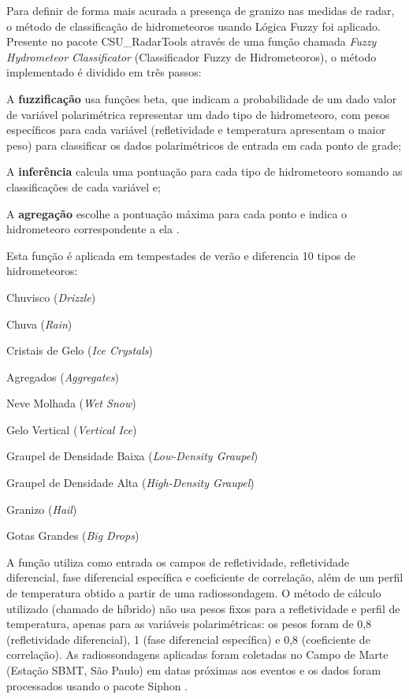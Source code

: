 Para definir de forma mais acurada a presença de granizo nas medidas de radar, o método de classificação de hidrometeoros usando Lógica Fuzzy foi aplicado. Presente no pacote CSU\_RadarTools \cite{Lang2017a} através de uma função chamada \textit{Fuzzy Hydrometeor Classificator} (Classificador Fuzzy de Hidrometeoros), o método implementado é dividido em três passos:

\begin{alineas}
	\item A \textbf{fuzzificação} usa funções beta, que indicam a probabilidade de um dado valor de variável polarimétrica representar um dado tipo de hidrometeoro, com pesos específicos para cada variável (refletividade e temperatura apresentam o maior peso) para classificar os dados polarimétricos de entrada em cada ponto de grade;
	\item A \textbf{inferência} calcula uma pontuação para cada tipo de hidrometeoro somando as classificações de cada variável e;
	\item A \textbf{agregação} escolhe a pontuação máxima para cada ponto e indica o hidrometeoro correspondente a ela \cite{Liu2000a}.
\end{alineas}

Esta função é aplicada em tempestades de verão e diferencia 10 tipos de hidrometeoros:

\begin{alineas}
	\item Chuvisco (\textit{Drizzle})
	\item Chuva (\textit{Rain})
	\item Cristais de Gelo (\textit{Ice Crystals})
	\item Agregados (\textit{Aggregates})
	\item Neve Molhada (\textit{Wet Snow})
	\item Gelo Vertical (\textit{Vertical Ice})
	\item Graupel de Densidade Baixa (\textit{Low-Density Graupel})
	\item Graupel de Densidade Alta (\textit{High-Density Graupel})
	\item Granizo (\textit{Hail})
	\item Gotas Grandes (\textit{Big Drops})
\end{alineas}

A função utiliza como entrada os campos de refletividade, refletividade diferencial, fase diferencial específica e coeficiente de correlação, além de um perfil de temperatura obtido a partir de uma radiossondagem. O método de cálculo utilizado (chamado de híbrido) não usa pesos fixos para a refletividade e perfil de temperatura, apenas para as variáveis polarimétricas: os pesos foram de 0,8 (refletividade diferencial), 1 (fase diferencial específica) e 0,8 (coeficiente de correlação). As radiossondagens aplicadas foram coletadas no Campo de Marte (Estação SBMT, São Paulo) em datas próximas aos eventos e os dados foram processados usando o pacote Siphon \cite{siphon}.

